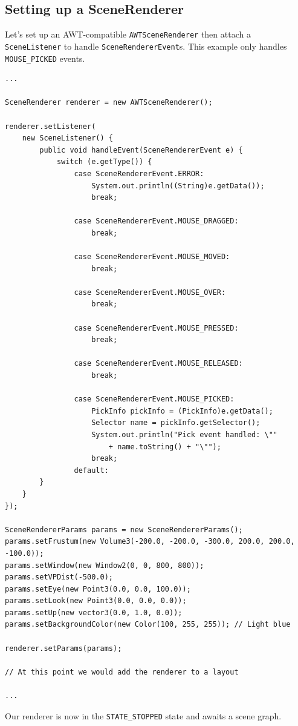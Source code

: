\documentclass[10pt,aps, prb,preprint]{article}
\begin{document}
\subsection{Setting up a SceneRenderer}
Let's set up an AWT-compatible \texttt{AWTSceneRenderer} then attach a \texttt{SceneListener} to handle \texttt{SceneRendererEvent}s. This example only handles \texttt{MOUSE\_PICKED} events.
\begin{verbatim}
...

SceneRenderer renderer = new AWTSceneRenderer();

renderer.setListener(
    new SceneListener() {
        public void handleEvent(SceneRendererEvent e) {
            switch (e.getType()) {
                case SceneRendererEvent.ERROR:
                    System.out.println((String)e.getData());
                    break;

                case SceneRendererEvent.MOUSE_DRAGGED:
                    break;

                case SceneRendererEvent.MOUSE_MOVED:
                    break;

                case SceneRendererEvent.MOUSE_OVER:
                    break;

                case SceneRendererEvent.MOUSE_PRESSED:
                    break;

                case SceneRendererEvent.MOUSE_RELEASED:
                    break;

                case SceneRendererEvent.MOUSE_PICKED:
                    PickInfo pickInfo = (PickInfo)e.getData();
                    Selector name = pickInfo.getSelector();
                    System.out.println("Pick event handled: \""
                        + name.toString() + "\"");
                    break;
                default:
        }
    }
});

SceneRendererParams params = new SceneRendererParams();
params.setFrustum(new Volume3(-200.0, -200.0, -300.0, 200.0, 200.0, -100.0));
params.setWindow(new Window2(0, 0, 800, 800));
params.setVPDist(-500.0);
params.setEye(new Point3(0.0, 0.0, 100.0));
params.setLook(new Point3(0.0, 0.0, 0.0));
params.setUp(new vector3(0.0, 1.0, 0.0));
params.setBackgroundColor(new Color(100, 255, 255)); // Light blue

renderer.setParams(params);

// At this point we would add the renderer to a layout

...

\end{verbatim}
Our renderer is now in the \texttt{STATE\_STOPPED} state and awaits a scene graph.
\end{document}
